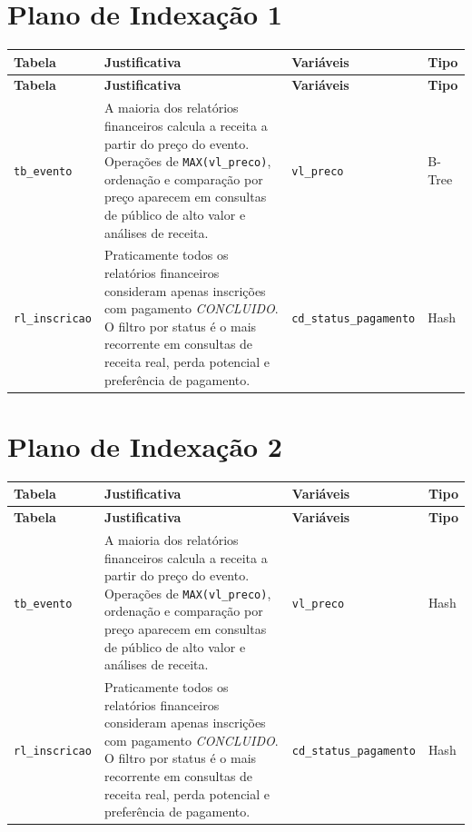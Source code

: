 \documentclass[a4paper,11pt]{article}
\begin{document}
\section*{Plano de Indexação 1}

\begin{longtable}{|l|p{7cm}|l|l|}
\hline
\textbf{Tabela} & \textbf{Justificativa} & \textbf{Variáveis} & \textbf{Tipo} \\
\hline
\endfirsthead
\hline
\textbf{Tabela} & \textbf{Justificativa} & \textbf{Variáveis} & \textbf{Tipo} \\
\hline
\endhead
\texttt{tb\_evento} & A maioria dos relatórios financeiros calcula a receita a partir do preço do evento. Operações de \texttt{MAX(vl\_preco)}, ordenação e comparação por preço aparecem em consultas de público de alto valor e análises de receita. & \texttt{vl\_preco} & B-Tree \\
\hline
\texttt{rl\_inscricao} & Praticamente todos os relatórios financeiros consideram apenas inscrições com pagamento \textit{CONCLUIDO}. O filtro por status é o mais recorrente em consultas de receita real, perda potencial e preferência de pagamento. & \texttt{cd\_status\_pagamento} & Hash \\
\hline
\end{longtable}

\bigskip
\section*{Plano de Indexação 2}

\begin{longtable}{|l|p{7cm}|l|l|}
\hline
\textbf{Tabela} & \textbf{Justificativa} & \textbf{Variáveis} & \textbf{Tipo} \\
\hline
\endfirsthead
\hline
\textbf{Tabela} & \textbf{Justificativa} & \textbf{Variáveis} & \textbf{Tipo} \\
\hline
\endhead
\texttt{tb\_evento} & A maioria dos relatórios financeiros calcula a receita a partir do preço do evento. Operações de \texttt{MAX(vl\_preco)}, ordenação e comparação por preço aparecem em consultas de público de alto valor e análises de receita. & \texttt{vl\_preco} & Hash \\
\hline
\texttt{rl\_inscricao} & Praticamente todos os relatórios financeiros consideram apenas inscrições com pagamento \textit{CONCLUIDO}. O filtro por status é o mais recorrente em consultas de receita real, perda potencial e preferência de pagamento. & \texttt{cd\_status\_pagamento} & Hash \\
\hline
\end{longtable}
\end{document}
